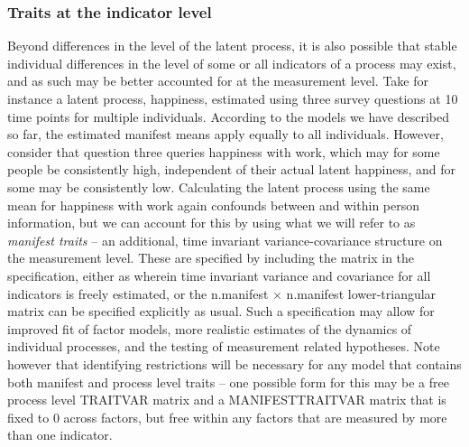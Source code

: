 \documentclass[nojss]{jss}\usepackage[]{graphicx}\usepackage[]{color}
\begin{document}
\subsubsection{Traits at the indicator level} \label{sec:manifesttraits}\nopagebreak
Beyond differences in the level of the latent process, it is also possible that stable individual differences in the level of some or all indicators of a process may exist, and as such may be better accounted for at the measurement level. Take for instance a latent process, happiness, estimated using three survey questions at 10 time points for multiple individuals. According to the models we have described so far, the estimated manifest means apply equally to all individuals. However, consider that question three queries happiness with work, which may for some people be consistently high, independent of their actual latent happiness, and for some may be consistently low. Calculating the latent process using the same mean for happiness with work again confounds between and within person information, but we can account for this by using what we will refer to as \textit{manifest traits} -- an additional, time invariant variance-covariance structure on the measurement level. These are specified by including the  matrix in the  specification, either as  wherein time invariant variance and covariance for all indicators is freely estimated, or the n.manifest $ \times $ n.manifest lower-triangular matrix can be specified explicitly as usual. Such a specification may allow for improved fit of factor models, more realistic estimates of the dynamics of individual processes, and the testing of measurement related hypotheses. Note however that identifying restrictions will be necessary for any model that contains both manifest and process level traits -- one possible form for this may be a free process level TRAITVAR matrix and a MANIFESTTRAITVAR matrix that is fixed to 0 across factors, but free within any factors that are measured by more than one indicator.
\end{document}
